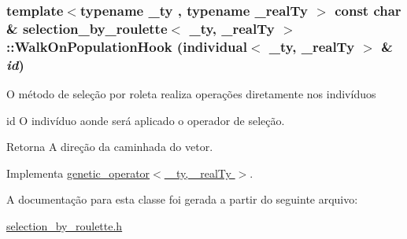 \hypertarget{classselection__by__roulette_a98be3d54afb87450f190615f7da330e9}{
\subsubsection[{WalkOnPopulationHook}]{\setlength{\rightskip}{0pt plus 5cm}template$<$typename \_\-ty , typename \_\-realTy $>$ const char \& {\bf selection\_\-by\_\-roulette}$<$ \_\-ty, \_\-realTy $>$::WalkOnPopulationHook ({\bf individual}$<$ \_\-ty, \_\-realTy $>$ \& {\em id})}}
\label{classselection__by__roulette_a98be3d54afb87450f190615f7da330e9}
O método de seleção por roleta realiza operações diretamente nos indivíduos

id O indivíduo aonde será aplicado o operador de seleção.

\begin{DoxyReturn}{Retorna}
A direção da caminhada do vetor. 
\end{DoxyReturn}


Implementa \hyperlink{classgenetic__operator_a3405bb5335111bd675d408aa8db052fa}{genetic\_\-operator$<$ \_\-ty, \_\-realTy $>$}.



A documentação para esta classe foi gerada a partir do seguinte arquivo:\begin{DoxyCompactItemize}
\item 
\hyperlink{selection__by__roulette_8h}{selection\_\-by\_\-roulette.h}\end{DoxyCompactItemize}
